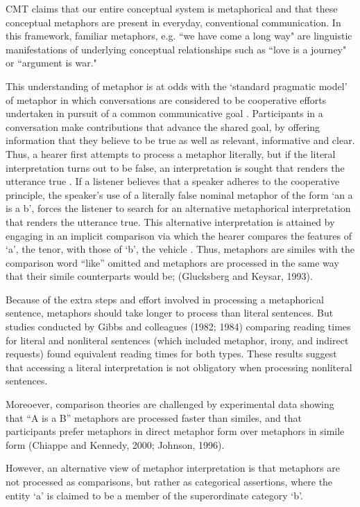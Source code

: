 \documentclass[]{article}
\begin{document}
	CMT claims that our entire conceptual system is metaphorical and that these conceptual metaphors are present in everyday, conventional communication. In this framework, familiar metaphors, e.g. ``we have come a long way" are linguistic manifestations of underlying conceptual relationships such as ``love is a journey" or ``argument is war." 
	
	This understanding of metaphor is at odds with the `standard pragmatic model' of metaphor in which conversations are considered to be cooperative efforts undertaken in pursuit of  a common communicative goal \parencite{grice_logic_1975}.  Participants in a conversation make contributions that advance the shared goal, by offering information that they believe to be true as well as relevant, informative and clear. Thus, a hearer first attempts to process a metaphor literally, but if the literal interpretation turns out to be false, an interpretation is sought that renders the utterance true \parencite{searle}. If a listener believes that a speaker adheres to the cooperative principle, the speaker's use of a literally false nominal metaphor of the form `an a is a b', forces the listener to search for an alternative metaphorical interpretation that renders the utterance true.  This alternative interpretation is attained by engaging in an implicit comparison via which the hearer compares the features of `a’, the tenor, with those of `b’, the vehicle \parencite{ortony_beyond_1979, gentner_structure-mapping:_1983}. Thus, metaphors are similes with the comparison word “like” omitted and metaphors are processed in the same way that their simile counterparts would be;  (Glucksberg and Keysar, 1993).
	
	Because of the extra steps and effort involved in processing a metaphorical sentence, metaphors should take longer to process than literal sentences. But studies conducted by Gibbs and colleagues (1982; 1984) comparing reading times for literal and nonliteral sentences (which included metaphor, irony, and indirect requests) found equivalent reading times for both types. These results suggest that accessing a literal interpretation is not obligatory when processing nonliteral sentences. 
	
	Moreoever, comparison theories are challenged by experimental data showing that “A is a B” metaphors are processed faster than similes, and that participants prefer metaphors in direct metaphor form over metaphors in simile form (Chiappe and Kennedy, 2000; Johnson, 1996).
	
	However, an alternative view of metaphor interpretation is that metaphors are not processed as comparisons, but rather as categorical assertions, where the entity ‘a’ is claimed to be a member of the superordinate category ‘b’.  
	
\end{document}
